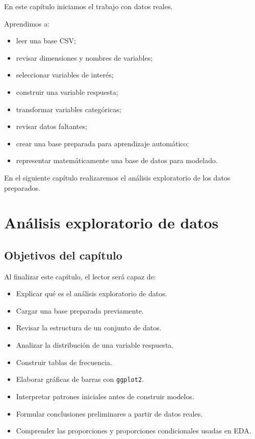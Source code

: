 \documentclass[
  11pt,
  letterpaper,
]{book}
\providecommand{\tightlist}{%
  \setlength{\itemsep}{0pt}\setlength{\parskip}{0pt}}
\begin{document}
En este capítulo iniciamos el trabajo con datos reales.

Aprendimos a:

\begin{itemize}
\tightlist
\item
  leer una base CSV;
\item
  revisar dimensiones y nombres de variables;
\item
  seleccionar variables de interés;
\item
  construir una variable respuesta;
\item
  transformar variables categóricas;
\item
  revisar datos faltantes;
\item
  crear una base preparada para aprendizaje automático;
\item
  representar matemáticamente una base de datos para modelado.
\end{itemize}

En el siguiente capítulo realizaremos el análisis exploratorio de los
datos preparados.


\chapter{Análisis exploratorio de
datos}\label{anuxe1lisis-exploratorio-de-datos}

\section{Objetivos del capítulo}\label{objetivos-del-capuxedtulo-2}

Al finalizar este capítulo, el lector será capaz de:

\begin{itemize}
\tightlist
\item
  Explicar qué es el análisis exploratorio de datos.
\item
  Cargar una base preparada previamente.
\item
  Revisar la estructura de un conjunto de datos.
\item
  Analizar la distribución de una variable respuesta.
\item
  Construir tablas de frecuencia.
\item
  Elaborar gráficas de barras con \texttt{ggplot2}.
\item
  Interpretar patrones iniciales antes de construir modelos.
\item
  Formular conclusiones preliminares a partir de datos reales.
\item
  Comprender las proporciones y proporciones condicionales usadas en
  EDA.
\end{itemize}
\end{document}
